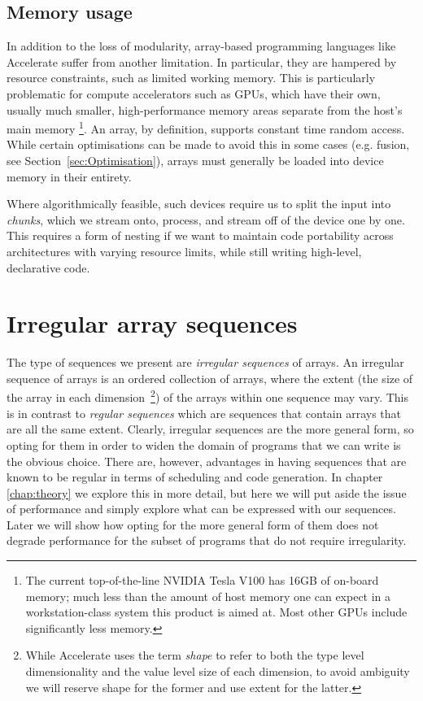 \subsection{Memory usage}
\label{sec:problem_2}

In addition to the loss of modularity, array-based programming languages like Accelerate suffer from another limitation. In particular, they are hampered by resource constraints, such as limited working memory. This is particularly problematic for compute accelerators such as GPUs, which have their own, usually much smaller, high-performance memory areas separate from the host's main memory%
\footnote{The current top-of-the-line NVIDIA Tesla V100 has 16GB of on-board
memory; much less than the amount of host memory one can expect in a
workstation-class system this product is aimed at. Most other GPUs include significantly less memory.}.
An array, by definition, supports constant time random access. While certain optimisations can be made to avoid this in some cases (e.g. fusion, see Section~\ref{sec:Optimisation}), arrays must generally be loaded into device memory in their entirety.

Where algorithmically feasible, such devices require us to split the input into \emph{chunks}, which we stream onto, process, and stream off of the device one by one. This requires a form of nesting if we want to maintain code portability across architectures with varying resource limits, while still writing high-level, declarative code.

\section{Irregular array sequences}
\label{sec:sequences}

The type of sequences we present are \emph{irregular sequences} of arrays. An irregular sequence of arrays is an ordered collection of arrays, where the extent (the size of the array in each dimension~\footnote{While Accelerate uses the term \emph{shape} to refer to both the type level dimensionality and the value level size of each dimension, to avoid ambiguity we will reserve shape for the former and use extent for the latter.}) of the arrays within one sequence may vary. This is in contrast to \emph{regular sequences} which are sequences that contain arrays that are all the same extent. Clearly, irregular sequences are the more general form, so opting for them in order to widen the domain of programs that we can write is the obvious choice. There are, however, advantages in having sequences that are known to be regular in terms of scheduling and code generation. In chapter \ref{chap:theory} we explore this in more detail, but here we will put aside the issue of performance and simply explore what can be expressed with our sequences. Later we will show how opting for the more general form of them does not degrade performance for the subset of programs that do not require irregularity.

